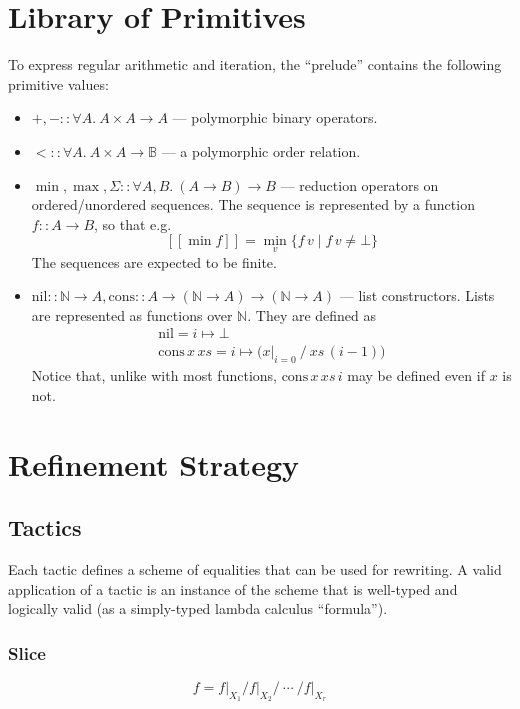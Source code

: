 \documentclass{article}
\newcommand\N{\mathbb{N}}
\newcommand\B{\mathbb{B}}
\newcommand\semp[1]{[\![{#1}]\!]}
\begin{document}
\section{Library of Primitives}

To express regular arithmetic and iteration, the ``prelude'' contains the following primitive
values:

\begin{itemize}
  \item ${+}, {-} :: \forall A.~A\times A\to A$ --- polymorphic binary operators.
  \item ${<} :: \forall A. ~A\times A\to\B$ --- a polymorphic order relation.
  \item $\min, \max, \Sigma :: \forall A,B.~ (A\to B)\to B$ --- reduction operators
    on ordered/unordered sequences. The sequence is represented by a function $f :: A\to B$,
    so that e.g. \[\semp{\min f} = \min_v \{f\,v \;|\; f\,v\neq\bot\}\]
    The sequences are expected to be finite.
  \item $\mathrm{nil} :: \N\to A, \mathrm{cons} :: A \to (\N\to A)\to(\N\to A)$ --- list constructors.
    Lists are represented as functions over $\N$. They are defined as
    \[\begin{array}{l}\mathrm{nil}=i\mapsto\bot \\
        \mathrm{cons}\,x\,xs = i\mapsto \big(x\big|_{i=0} ~\big/~ xs\,(i-1)\big)\end{array}\]
    Notice that, unlike with most functions, $\mathrm{cons}\,x\,xs\,i$ may be defined even if $x$ is not.
\end{itemize}


\section{Refinement Strategy}

\subsection{Tactics}

Each tactic defines a scheme of equalities that can be used for rewriting.
A valid application of a tactic is an instance of the scheme that is well-typed and logically valid
(as a simply-typed lambda calculus ``formula'').

\subsubsection{Slice}
\[f = f\big|_{X_1} \Big/ f\big|_{X_2} \Big/ ~\cdots~ \Big/ f\big|_{X_r}\]
\end{document}

